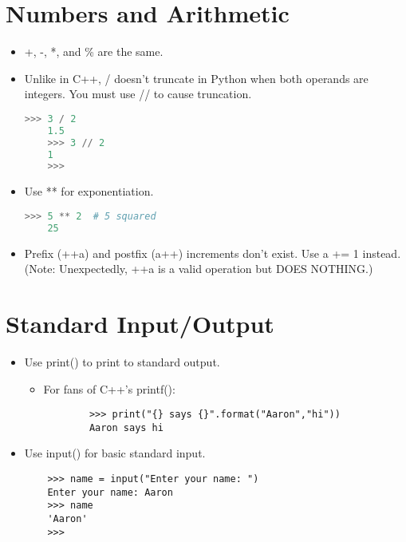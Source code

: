 \documentclass{article}
\begin{document}
\section{Numbers and Arithmetic}
\begin{itemize}
    \item +, -, *, and \% are the same.
    \item Unlike in C++, / doesn't truncate in Python when both operands are integers. You must use // to cause truncation.
    \begin{lstlisting}[language=Python]
    >>> 3 / 2
    1.5
    >>> 3 // 2
    1
    >>> 
    \end{lstlisting}
    \item Use ** for exponentiation.
    \begin{lstlisting}[language=Python]
    >>> 5 ** 2  # 5 squared
    25
    \end{lstlisting}
    \item Prefix (++a) and postfix (a++) increments don't exist. Use a += 1 instead. (Note: Unexpectedly, ++a is a valid operation but DOES NOTHING.) 

\end{itemize}

\section{Standard Input/Output}
\begin{itemize}
    \item Use print() to print to standard output.
        \begin{itemize}
        \item For fans of C++'s printf():
        \begin{lstlisting}
        >>> print("{} says {}".format("Aaron","hi"))
        Aaron says hi
        \end{lstlisting}
        \end{itemize}
    \item Use input() for basic standard input.
    \begin{lstlisting}
    >>> name = input("Enter your name: ")
    Enter your name: Aaron
    >>> name
    'Aaron'
    >>> 
    \end{lstlisting}
\end{itemize}
\end{document}
